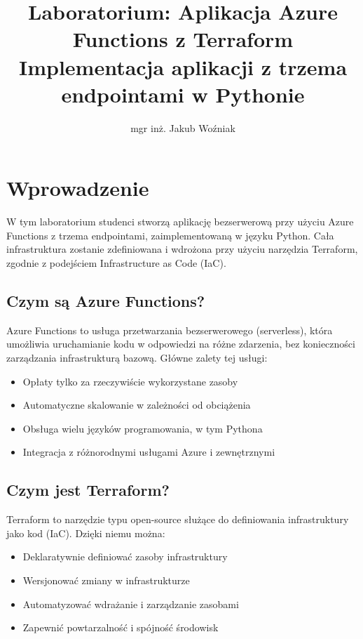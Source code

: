 \documentclass{article}
\title{Laboratorium: Aplikacja Azure Functions z Terraform\\
\large Implementacja aplikacji z trzema endpointami w Pythonie}
\author{mgr inż. Jakub Woźniak}
\date{}
\begin{document}
\maketitle

\section{Wprowadzenie}

W tym laboratorium studenci stworzą aplikację bezserwerową przy użyciu Azure Functions z trzema endpointami, zaimplementowaną w języku Python. Cała infrastruktura zostanie zdefiniowana i wdrożona przy użyciu narzędzia Terraform, zgodnie z podejściem Infrastructure as Code (IaC).

\subsection{Czym są Azure Functions?}

Azure Functions to usługa przetwarzania bezserwerowego (serverless), która umożliwia uruchamianie kodu w odpowiedzi na różne zdarzenia, bez konieczności zarządzania infrastrukturą bazową. Główne zalety tej usługi:

\begin{itemize}
    \item Opłaty tylko za rzeczywiście wykorzystane zasoby
    \item Automatyczne skalowanie w zależności od obciążenia
    \item Obsługa wielu języków programowania, w tym Pythona
    \item Integracja z różnorodnymi usługami Azure i zewnętrznymi
\end{itemize}

\subsection{Czym jest Terraform?}

Terraform to narzędzie typu open-source służące do definiowania infrastruktury jako kod (IaC). Dzięki niemu można:

\begin{itemize}
    \item Deklaratywnie definiować zasoby infrastruktury
    \item Wersjonować zmiany w infrastrukturze
    \item Automatyzować wdrażanie i zarządzanie zasobami
    \item Zapewnić powtarzalność i spójność środowisk
\end{itemize}
\end{document}
